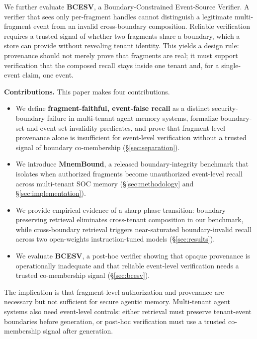 \documentclass[conference,compsoc]{IEEEtran}
\begin{document}
We further evaluate \textbf{BCESV}, a Boundary-Constrained Event-Source Verifier. A verifier that sees only per-fragment handles cannot distinguish a legitimate multi-fragment event from an invalid cross-boundary composition. Reliable verification requires a trusted signal of whether two fragments share a boundary, which a store can provide without revealing tenant identity. This yields a design rule: provenance should not merely prove that fragments are real; it must support verification that the composed recall stays inside one tenant and, for a single-event claim, one event.

\textbf{Contributions.} This paper makes four contributions.

\begin{itemize}
\item We define \textbf{fragment-faithful, event-false recall} as a distinct security-boundary failure in multi-tenant agent memory systems, formalize boundary-set and event-set invalidity predicates, and prove that fragment-level provenance alone is insufficient for event-level verification without a trusted signal of boundary co-membership (\S\ref{sec:separation}).
\item We introduce \textbf{MnemBound}, a released boundary-integrity benchmark that isolates when authorized fragments become unauthorized event-level recall across multi-tenant SOC memory (\S\ref{sec:methodology} and \S\ref{sec:implementation}).
\item We provide empirical evidence of a sharp phase transition: boundary-preserving retrieval eliminates cross-tenant composition in our benchmark, while cross-boundary retrieval triggers near-saturated boundary-invalid recall across two open-weights instruction-tuned models (\S\ref{sec:results}).
\item We evaluate \textbf{BCESV}, a post-hoc verifier showing that opaque provenance is operationally inadequate and that reliable event-level verification needs a trusted co-membership signal (\S\ref{sec:bcesv}).
\end{itemize}

The implication is that fragment-level authorization and provenance are necessary but not sufficient for secure agentic memory. Multi-tenant agent systems also need event-level controls: either retrieval must preserve tenant-event boundaries before generation, or post-hoc verification must use a trusted co-membership signal after generation.

\end{document}
